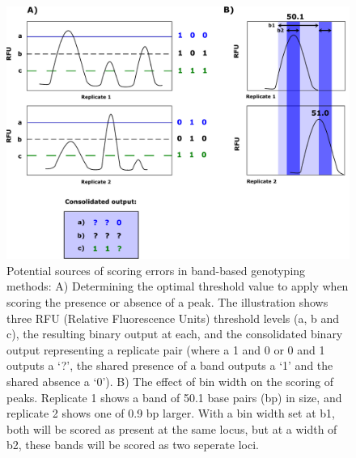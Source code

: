 \begin{figure}[H]
	\centering
	\includegraphics[scale = 0.7]{Images/source_of_scoring_errors.pdf}
	\caption{Potential sources of scoring errors in band-based genotyping methods: A) Determining the optimal threshold value to apply when scoring the presence or absence of a peak. The illustration shows three RFU (Relative Fluorescence Units) threshold levels (a, b and c), the resulting binary output at each, and the consolidated binary output representing a replicate pair (where a 1 and 0 or 0 and 1 outputs a `?', the shared presence of a band outputs a `1' and the shared absence a `0'). B) The effect of bin width on the scoring of peaks. Replicate 1 shows a band of 50.1 base pairs (bp) in size, and replicate 2 shows one of 0.9 bp larger. With a bin width set at b1, both will be scored as present at the same locus, but at a width of b2, these bands will be scored as two seperate loci.}
	\label{fig:scoring_errors}
\end{figure} 